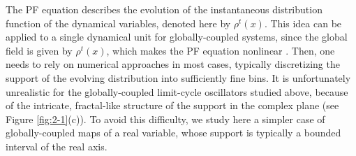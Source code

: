 \documentclass[12pt]{iopart}
\begin{document}
The PF equation describes the evolution
 of the instantaneous distribution function of the dynamical variables,
 denoted here by $\rho^t(x)$.
This idea can be applied to a single dynamical unit
 for globally-coupled systems,
 since the global field is given by $\rho^t(x)$,
 which makes the PF equation nonlinear
 \cite{Pikovsky.Kurths-PRL1994,Shibata.etal-PRL1999,Kaneko-PD1995}.
Then, one
 needs to rely on numerical approaches in most cases,
 typically discretizing the support of the evolving distribution
 into sufficiently fine bins.
It is unfortunately unrealistic for
 the globally-coupled limit-cycle oscillators
 studied above,
 because of the intricate, fractal-like structure of the support
 in the complex plane
 (see Figure \ref{fig:2-1}(c)).
To avoid this difficulty, we study here
 a simpler case of globally-coupled maps of a real variable,
 whose support is typically a bounded interval of the real axis.
\end{document}
